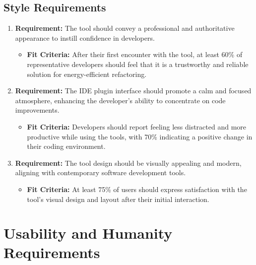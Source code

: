\documentclass[12pt]{article}
\begin{document}
\subsection{Style Requirements}
\begin{enumerate}
    \item \textbf{Requirement:} The tool should convey a professional and authoritative appearance to instill confidence in developers.
    \begin{itemize}[label={}]
        \item \textbf{Fit Criteria:} After their first encounter with the tool, at least 60\% of representative developers should feel that it is a trustworthy and reliable solution for energy-efficient refactoring.
    \end{itemize}
    \item \textbf{Requirement:} The IDE plugin interface should promote a calm and focused atmosphere, enhancing the developer's ability to concentrate on code improvements.
    \begin{itemize}[label={}]
        \item \textbf{Fit Criteria:} Developers should report feeling less distracted and more productive while using the tools, with 70\% indicating a positive change in their coding environment.
    \end{itemize}
    \item \textbf{Requirement:} The tool design should be visually appealing and modern, aligning with contemporary software development tools.
    \begin{itemize}[label={}]
        \item \textbf{Fit Criteria:} At least 75\% of users should express satisfaction with the tool's visual design and layout after their initial interaction.
    \end{itemize}
\end{enumerate}

\section{Usability and Humanity Requirements}
\end{document}
